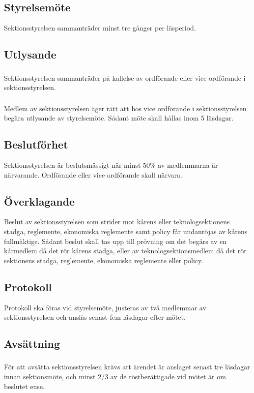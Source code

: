 \documentclass[a4paper]{dtek}
\begin{document}
\subsection{Styrelsemöte}
Sektionsstyrelsen sammanträder minst tre gånger per läsperiod.
\subsection{Utlysande}
\subsubsection{}
Sektionsstyrelsen sammanträder på kallelse av ordförande eller vice ordförande i sektionsstyrelsen.
\subsubsection{}
Medlem av sektionsstyrelsen äger rätt att hos vice ordförande i sektionsstyrelsen begära utlysande av styrelsemöte. Sådant möte skall hållas inom 5 läsdagar.
\subsection{Beslutförhet}
Sektionsstyrelsen är beslutsmässigt när minst 50\% av medlemmarna är närvarande. Ordförande eller vice ordförande skall närvara.
\subsection{Överklagande}
Beslut av sektionsstyrelsen som strider mot kårens eller teknologsektionens stadga, reglemente, ekonomiska reglemente samt policy får undanröjas av kårens fullmäktige. Sådant beslut skall tas upp till prövning om det begärs av en kårmedlem då det rör kårens stadga, eller av teknologsektionsmedlem då det rör sektionens stadga, reglemente, ekonomiska reglemente eller policy.
\subsection{Protokoll}
Protokoll ska föras vid styrelsemöte, justeras av två medlemmar av
sektionsstyrelsen och anslås senast fem läsdagar efter mötet.
\subsection{Avsättning}
\subsubsection{}
För att avsätta sektionsstyrelsen krävs att ärendet är anslaget senast tre läsdagar innan sektionsmöte, och minst 2/3 av de röstberättigade vid mötet är om beslutet ense.
\end{document}
